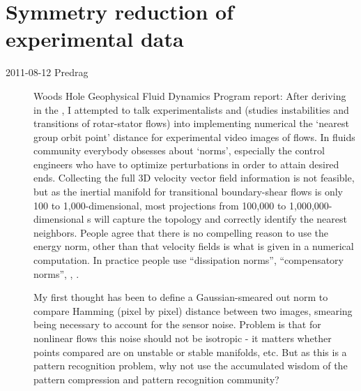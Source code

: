 
\chapter{Symmetry reduction of experimental data}
\label{c-exp}

\begin{description}

\item[2011-08-12 Predrag] Woods Hole Geophysical Fluid Dynamics Program
report: After deriving in
the \mslices, I attempted to talk experimentalists
 and
 (studies instabilities
and transitions of rotar-stator flows) into implementing numerical the
`nearest group orbit point' distance for experimental video images of
flows. In fluids community everybody obsesses about `norms', especially
the control engineers who have to optimize perturbations in order to
attain desired ends. Collecting the full 3D velocity vector field information is
not feasible, but as the inertial manifold for transitional boundary-shear flows
is only 100 to 1,000-dimensional, most projections from 100,000 to
1,000,000-dimensional \statesp s will capture the topology and correctly
identify the nearest neighbors. People agree that there is no compelling
reason to use the energy norm, other than that velocity fields is what is
given in a numerical computation. In practice people use ``dissipation
norms'', ``compensatory norms'', \etc, \etc.

My first thought has been to define a Gaussian-smeared out norm to
compare Hamming (pixel by pixel) distance between two images, smearing
being necessary to account for the sensor noise. Problem is that for
nonlinear flows this noise should not be isotropic
- it matters whether points compared are on unstable or stable manifolds,
etc. But as this is a pattern recognition problem, why not use the
accumulated wisdom of the pattern compression and pattern recognition
community?


\end{description}

